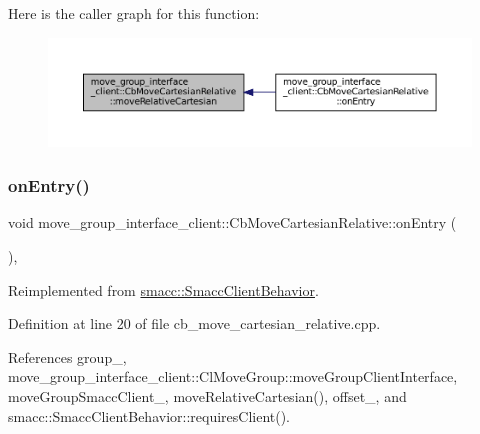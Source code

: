 Here is the caller graph for this function\+:
\nopagebreak
\begin{figure}[H]
\begin{center}
\leavevmode
\includegraphics[width=350pt]{classmove__group__interface__client_1_1CbMoveCartesianRelative_a85b6b1c8738c372174dff8fd98ec1b7a_icgraph}
\end{center}
\end{figure}
\mbox{\label{classmove__group__interface__client_1_1CbMoveCartesianRelative_a549d1612f552cab64208c37b7e383e1c}} 
\subsubsection{\texorpdfstring{on\+Entry()}{onEntry()}}
{\footnotesize\ttfamily void move\+\_\+group\+\_\+interface\+\_\+client\+::\+Cb\+Move\+Cartesian\+Relative\+::on\+Entry (\begin{DoxyParamCaption}{ }\end{DoxyParamCaption})\hspace{0.3cm}{\ttfamily [override]}, {\ttfamily [virtual]}}



Reimplemented from \hyperlink{classsmacc_1_1SmaccClientBehavior_a7962382f93987c720ad432fef55b123f}{smacc\+::\+Smacc\+Client\+Behavior}.



Definition at line 20 of file cb\+\_\+move\+\_\+cartesian\+\_\+relative.\+cpp.



References group\+\_\+, move\+\_\+group\+\_\+interface\+\_\+client\+::\+Cl\+Move\+Group\+::move\+Group\+Client\+Interface, move\+Group\+Smacc\+Client\+\_\+, move\+Relative\+Cartesian(), offset\+\_\+, and smacc\+::\+Smacc\+Client\+Behavior\+::requires\+Client().


